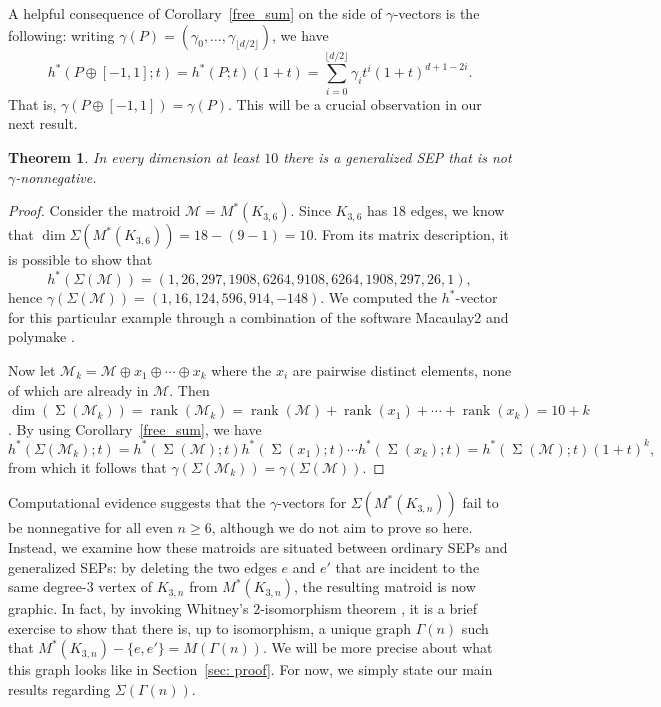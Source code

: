 \documentclass{amsart}
\numberwithin{equation}{section}
\theoremstyle{plain}
\newtheorem{thm}{Theorem}[section]
\theoremstyle{definition}
\DeclareMathOperator{\rk}{rank}
\newcommand{\calM}{\mathcal{M}}
\DeclareMathOperator{\SEP}{\Sigma}
\begin{document}
A helpful consequence of Corollary~\ref{free_sum} on the side of $\gamma$-vectors is the following: writing $\gamma(P) = (\gamma_0,\dots,\gamma_{\lfloor d/2 \rfloor})$, we have
\[
    h^*(P \oplus [-1,1]; t) = h^*(P;t)(1+t) = \sum_{i=0}^{\lfloor d/2\rfloor} \gamma_it^i(1+t)^{d+1-2i}.
\]
That is, $\gamma(P \oplus [-1, 1]) = \gamma(P)$.
This will be a crucial observation in our next result.

\begin{thm}\label{thm: not nonnegative}
    In every dimension at least $10$ there is a generalized SEP that is not $\gamma$-nonnegative.
\end{thm}

\begin{proof}
    Consider the matroid $\calM = M^*(K_{3,6})$.
    Since $K_{3,6}$ has $18$ edges, we know that $\dim \Sigma(M^*(K_{3,6}))=18-(9-1)=10$. 
    From its matrix description, it is possible to show that 
    \[
        h^*(\Sigma(\calM)) = (1, 26, 297, 1908, 6264, 9108, 6264, 1908, 297, 26, 1),
    \]
    hence $\gamma(\Sigma(\calM)) = (1, 16, 124, 596, 914, -148)$.
    We computed the $h^*$-vector for this particular example through a combination of the software Macaulay2 \cite{M2} and polymake \cite{polymake}. 
    
    Now let $\calM_k = \calM \oplus x_1 \oplus \cdots \oplus x_k$ where the $x_i$ are pairwise distinct elements, none of which are already in $\calM$.
    Then $\dim(\SEP(\calM_k)) = \rk(\calM_k)=
    \rk (\calM) + \rk(x_1) + \cdots + \rk(x_k) =10+k$. 
    By using Corollary~\ref{free_sum}, we have
    \[
        h^*(\Sigma(\calM_k); t) = h^*(\SEP(\calM); t) h^*(\SEP(x_1); t) \cdots h^*(\SEP(x_k); t) = 
        h^*(\SEP(\calM); t)(1+t)^k,
    \]
    from which it follows that $\gamma(\Sigma(\calM_k)) = \gamma(\Sigma(\calM))$.
\end{proof}

Computational evidence suggests that the $\gamma$-vectors for $\Sigma(M^*(K_{3,n}))$ fail to be nonnegative for all even $n \geq 6$, although we do not aim to prove so here.
Instead, we examine how these matroids are situated between ordinary SEPs and generalized SEPs: by deleting the two edges $e$ and $e'$ that are incident to the same degree-$3$ vertex of $K_{3,n}$
from $M^*(K_{3,n})$, the resulting matroid is now graphic.
In fact, by invoking Whitney's $2$-isomorphism theorem \cite[Theorem 5.3.1]{Oxley}, it is a brief exercise to show that there is, up to isomorphism, a unique graph $\Gamma(n)$ such that $M^*(K_{3,n}) - \{e,e'\} = M(\Gamma(n))$.
We will be more precise about what this graph looks like in Section~\ref{sec: proof}.
For now, we simply state our main results regarding $\Sigma(\Gamma(n))$.
\end{document}
